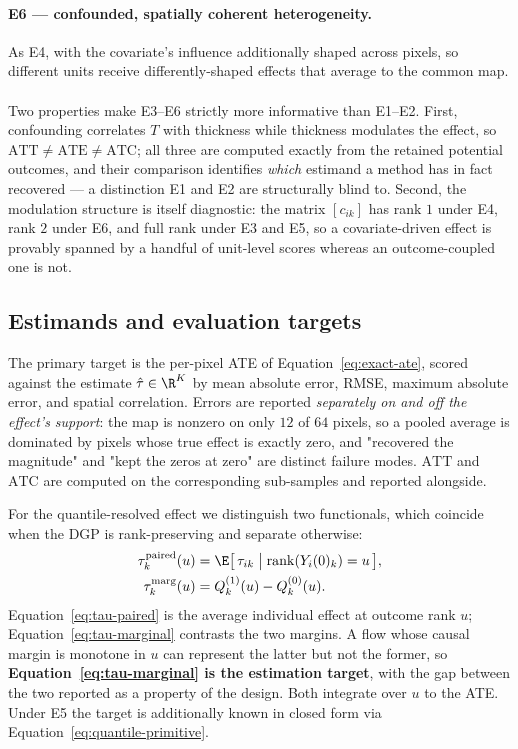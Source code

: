 \paragraph{E6 --- confounded, spatially coherent heterogeneity.} As E4, with the covariate's
influence additionally shaped across pixels, so different units receive differently-shaped
effects that average to the common map.

\paragraph{}
Two properties make E3--E6 strictly more informative than E1--E2. First, confounding
correlates $T$ with thickness while thickness modulates the effect, so $\mathrm{ATT} \ne
\mathrm{ATE} \ne \mathrm{ATC}$; all three are computed exactly from the retained potential
outcomes, and their comparison identifies \emph{which} estimand a method has in fact
recovered --- a distinction E1 and E2 are structurally blind to. Second, the modulation
structure is itself diagnostic: the matrix $[c_{ik}]$ has rank $1$ under E4, rank $2$ under
E6, and full rank under E3 and E5, so a covariate-driven effect is provably spanned by a
handful of unit-level scores whereas an outcome-coupled one is not.

\subsection{Estimands and evaluation targets}
\label{sec:targets}

The primary target is the per-pixel ATE of Equation~\eqref{eq:exact-ate}, scored against the
estimate $\hat{\tau} \in \R^K$ by mean absolute error, RMSE, maximum absolute error, and
spatial correlation. Errors are reported \emph{separately on and off the effect's support}:
the map is nonzero on only $12$ of $64$ pixels, so a pooled average is dominated by pixels
whose true effect is exactly zero, and "recovered the magnitude" and "kept the zeros at zero"
are distinct failure modes. $\mathrm{ATT}$ and $\mathrm{ATC}$ are computed on the corresponding
sub-samples and reported alongside.

For the quantile-resolved effect we distinguish two functionals, which coincide when the DGP
is rank-preserving and separate otherwise:
\begin{align}
    \tau^{\mathrm{paired}}_k(u) &= \E\big[\, \tau_{ik} \;\big|\; \mathrm{rank}(Y_i(0)_k) = u \,\big],
    \label{eq:tau-paired}\\
    \tau^{\mathrm{marg}}_k(u)   &= Q^{(1)}_k(u) - Q^{(0)}_k(u).
    \label{eq:tau-marginal}
\end{align}
Equation~\eqref{eq:tau-paired} is the average individual effect at outcome rank $u$;
Equation~\eqref{eq:tau-marginal} contrasts the two margins. A flow whose causal margin is
monotone in $u$ can represent the latter but not the former, so
\textbf{Equation~\eqref{eq:tau-marginal} is the estimation target}, with the gap between the
two reported as a property of the design. Both integrate over $u$ to the ATE. Under E5 the
target is additionally known in closed form via
Equation~\eqref{eq:quantile-primitive}.

